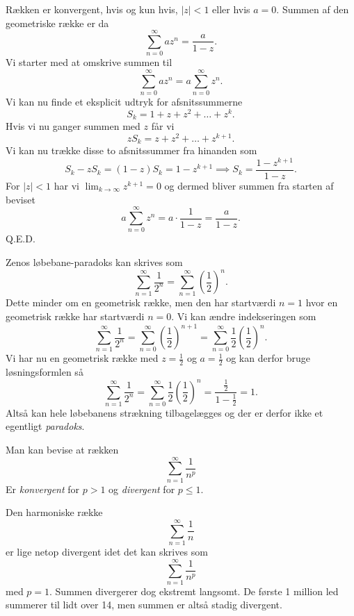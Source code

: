 \begin{sæt} 
  Rækken er konvergent, hvis og kun hvis, $|z| < 1$ eller hvis $a = 0$. Summen af den geometriske række er da
  \[ 
  \sum_{n = 0}^{\infty} a z^{n} = \frac{a}{1-z}
  .\]
  \tcblower
  Vi starter med at omskrive summen til
  \[ 
  \sum_{n = 0}^{\infty} a z^{n}= a \sum_{n = 0}^{\infty} z^{n}
  .\]
  Vi kan nu finde et eksplicit udtryk for afsnitssummerne
  \[
    S_k = 1 + z + z^2 + \ldots + z^{k}
  .\]
  Hvis vi nu ganger summen med $z$ får vi
  \[ 
  zS_k = z + z^2 + \ldots + z^{k+1}
  .\]
  Vi kan nu trække disse to afsnitssummer fra hinanden som
  \[
    S_k - zS_k = (1-z)S_k = 1 - z^{k+1} \implies S_k = \frac{1 - z^{k+1}}{1-z}
  .\]
  For $|z| < 1$ har vi $\lim_{k \to \infty} z^{k+1} = 0$ og dermed bliver summen fra starten af beviset
  \[ 
  a \sum_{n = 0}^{\infty} z^{n} = a \cdot \frac{1}{1-z} = \frac{a}{1-z}
  .\]
  Q.E.D.
\end{sæt}

\begin{eks} 
  Zenos løbebane-paradoks kan skrives som
  \[ 
  \sum_{n = 1}^{\infty} \frac{1}{2^{n}} = \sum_{n = 1}^{\infty} \left( \frac{1}{2} \right)^{n}
  .\]
  Dette minder om en geometrisk række, men den har startværdi $n = 1$ hvor en geometrisk række har startværdi $n = 0$. Vi kan ændre indekseringen som
  \[ 
  \sum_{n = 1}^{\infty} \frac{1}{2^{n}} = \sum_{n = 0}^{\infty} \left( \frac{1}{2} \right)^{n+1} = \sum_{n =0}^{\infty} \frac{1}{2} \left( \frac{1}{2} \right)^{n}
  .\]
  Vi har nu en geometrisk række med $z =\frac{1}{2}$ og $a = \frac{1}{2}$ og kan derfor bruge løsningsformlen så
  \[ 
  \sum_{n = 1}^{\infty} \frac{1}{2^{n}} = \sum_{n = 0}^{\infty} \frac{1}{2} \left( \frac{1}{2} \right)^{n} = \frac{\frac{1}{2}}{1 - \frac{1}{2}} = 1
  .\]
  Altså kan hele løbebanens strækning tilbagelægges og der er derfor ikke et egentligt \textit{paradoks}.
\end{eks}

\begin{sæt}
  Man kan bevise at rækken
  \[ 
  \sum_{n = 1}^{\infty} \frac{1}{n^{p}}
  \]
  Er \textit{konvergent} for $p >1$ og \textit{divergent} for $p \leq 1$.
\end{sæt}

\begin{eks} 
  Den harmoniske række
  \[ 
  \sum_{n = 1}^{\infty} \frac{1}{n}
  \]
  er lige netop divergent idet det kan skrives som
  \[ 
  \sum_{n =1}^{\infty} \frac{1}{n^{p}}
  \]
  med $p = 1$. Summen divergerer dog ekstremt langsomt. De første 1 million led summerer til lidt over 14, men summen er altså stadig divergent.
\end{eks}

